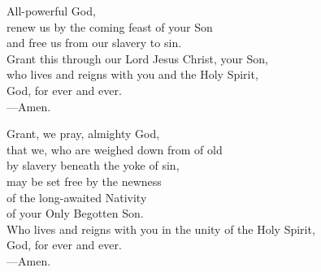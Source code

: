 \prayer


\begin{prayerverse}
All-powerful God,\\
renew us by the coming feast of your Son\\
and free us from our slavery to sin.\\
Grant this through our Lord Jesus Christ, your Son,\\
who lives and reigns with you and the Holy Spirit,\\
God, for ever and ever.\\
{\color{red}---\thinspace}Amen.
\end{prayerverse}


\begin{prayerverse}
Grant, we pray, almighty God,\\
that we, who are weighed down from of old\\
by slavery beneath the yoke of sin,\\
may be set free by the newness\\
of the long-awaited Nativity\\
of your Only Begotten Son.\\
Who lives and reigns with you in the unity of the Holy Spirit,\\
God, for ever and ever.\\
{\color{red}---\thinspace}Amen.

\end{prayerverse}

